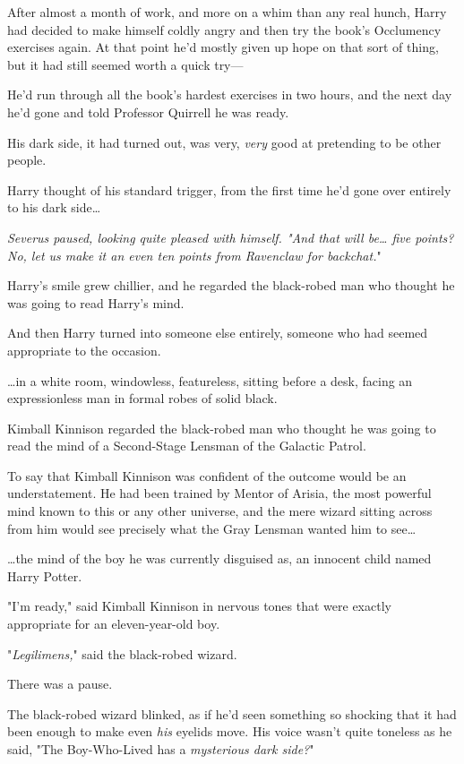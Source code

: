 After almost a month of work, and more on a whim than any real hunch, Harry had 
decided to make himself coldly angry and then try the book's Occlumency 
exercises again. At that point he'd mostly given up hope on that sort of thing, 
but it had still seemed worth a quick try---

He'd run through all the book's hardest exercises in two hours, and the next 
day he'd gone and told Professor Quirrell he was ready.

His dark side, it had turned out, was very, \emph{very} good at pretending to 
be other people.

Harry thought of his standard trigger, from the first time he'd gone over 
entirely to his dark side{\ldots}

\emph{Severus paused, looking quite pleased with himself. "And that will 
be{\ldots} five points? No, let us make it an even ten points from Ravenclaw 
for backchat.}"

Harry's smile grew chillier, and he regarded the black-robed man who thought he 
was going to read Harry's mind.

And then Harry turned into someone else entirely, someone who had seemed 
appropriate to the occasion.

{\ldots}in a white room, windowless, featureless, sitting before a desk, facing 
an expressionless man in formal robes of solid black.

Kimball Kinnison regarded the black-robed man who thought he was going to read 
the mind of a Second-Stage Lensman of the Galactic Patrol.

To say that Kimball Kinnison was confident of the outcome would be an 
understatement. He had been trained by Mentor of Arisia, the most powerful mind 
known to this or any other universe, and the mere wizard sitting across from 
him would see precisely what the Gray Lensman wanted him to see{\ldots}

{\ldots}the mind of the boy he was currently disguised as, an innocent child 
named Harry Potter.

"I'm ready," said Kimball Kinnison in nervous tones that were exactly 
appropriate for an eleven-year-old boy.

"\emph{Legilimens,}" said the black-robed wizard.

There was a pause.

The black-robed wizard blinked, as if he'd seen something so shocking that it 
had been enough to make even \emph{his} eyelids move. His voice wasn't quite 
toneless as he said, "The Boy-Who-Lived has a \emph{mysterious dark side?}"

